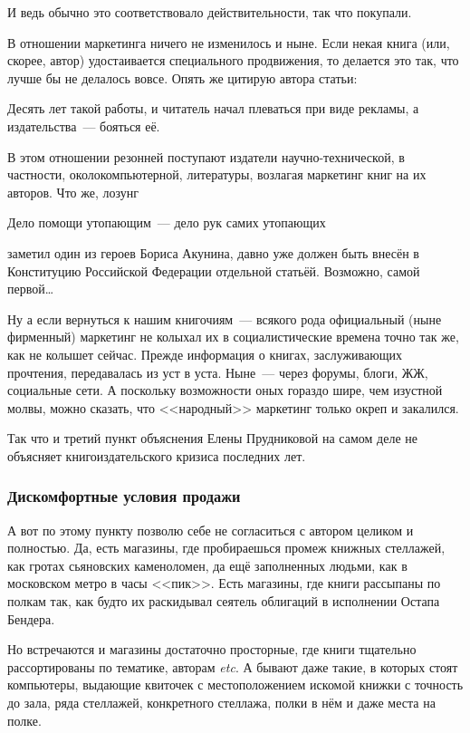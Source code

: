 И ведь обычно это соответствовало действительности, так что покупали.

В отношении маркетинга ничего не изменилось и ныне. Если некая книга (или, скорее, автор) удостаивается специального продвижения, то делается это так, что лучше бы не делалось вовсе. Опять же цитирую автора статьи:


\begin{shadequote}{}
Десять лет такой работы, и читатель начал плеваться при виде рекламы, а издательства~--- бояться её.
\end{shadequote}

В этом отношении резонней поступают издатели научно-технической, в частности, околокомпьютерной, литературы, возлагая маркетинг книг на их авторов. Что же, лозунг


\begin{shadequote}{}
Дело помощи утопающим~--- дело рук самих утопающих
\end{shadequote}

 заметил один из героев Бориса Акунина, давно уже должен быть внесён в Конституцию Российской Федерации отдельной статьёй. Возможно, самой первой\dots

Ну а если вернуться к нашим книгочиям~--- всякого рода официальный (ныне фирменный) маркетинг не колыхал их в социалистические времена точно так же, как не колышет сейчас. Прежде информация о книгах, заслуживающих прочтения, передавалась из уст в уста. Ныне~--- через форумы, блоги, ЖЖ, социальные сети. А поскольку возможности оных гораздо шире, чем изустной молвы, можно сказать, что <<народный>> маркетинг только окреп и закалился.

Так что и третий пункт объяснения Елены Прудниковой на самом деле не объясняет книгоиздательского кризиса последних лет.

\subsubsection{Дискомфортные условия продажи}
А вот по этому пункту позволю себе не согласиться с автором целиком и полностью. Да, есть магазины, где пробираешься промеж книжных стеллажей, как гротах сьяновских каменоломен, да ещё заполненных людьми, как в московском метро в часы <<пик>>. Есть магазины, где книги рассыпаны по полкам так, как будто их раскидывал сеятель облигаций в исполнении Остапа Бендера.

Но встречаются и магазины достаточно просторные, где книги тщательно рассортированы по тематике, авторам \textit{etc}. А бывают даже такие, в которых стоят компьютеры, выдающие квиточек с местоположением искомой книжки с точность до зала, ряда стеллажей, конкретного стеллажа, полки в нём и даже места на полке.

